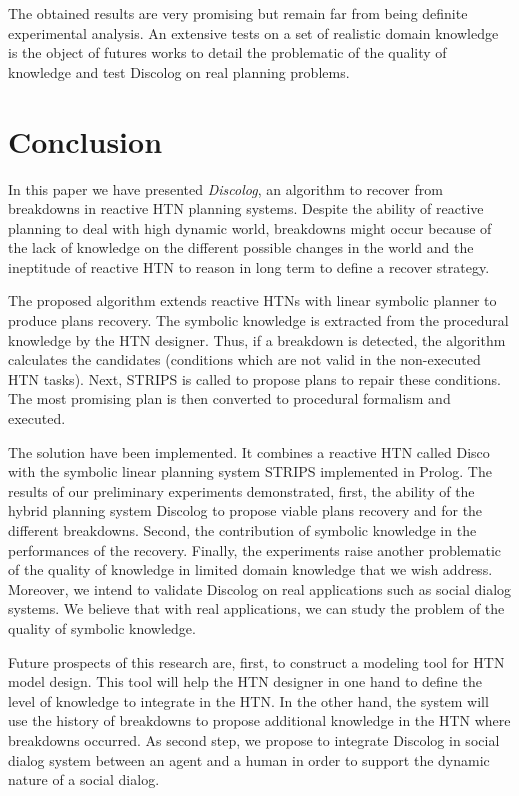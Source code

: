 \documentclass{llncs}
\begin{document}
			\par The obtained results are very promising but remain far from being definite experimental analysis. An extensive tests on a set of realistic domain knowledge is the object of futures works to detail the problematic of the quality of knowledge and test Discolog on real planning problems. 
			\section{Conclusion}
			\par In this paper we have presented \emph{Discolog}, an algorithm to recover from breakdowns in reactive HTN planning systems.  Despite the ability of reactive planning  to deal with high dynamic world,  breakdowns might occur because of the lack of knowledge on the different possible changes in the world and the ineptitude  of reactive HTN to reason in long term to define a recover strategy. 
			\par The proposed algorithm extends reactive HTNs with linear symbolic planner to produce plans recovery. The symbolic knowledge is extracted from the procedural knowledge by the HTN designer. Thus, if a breakdown is detected, the algorithm calculates the candidates (conditions which are not valid in the non-executed HTN tasks). Next,	STRIPS is called to propose plans to repair these conditions. The most promising plan is then converted to procedural formalism and executed. 
			\par The solution have been implemented. It combines a reactive HTN called Disco with the symbolic linear planning system STRIPS implemented in Prolog.  The results of our preliminary experiments  demonstrated, first, the ability of the hybrid planning system Discolog to propose viable plans recovery and for the different breakdowns. Second, the  contribution of symbolic knowledge in the performances of the recovery. Finally, the experiments raise another problematic of the quality of  knowledge in limited domain knowledge that we wish address. Moreover, we intend to validate Discolog on real  applications such as social dialog systems. We believe that with real applications, we can study the problem of the quality of symbolic knowledge.  
			\par Future prospects of this research are, first, to construct a modeling tool for HTN	model design. This tool will help the HTN designer in one hand to define the level of knowledge to integrate in the HTN. In the other hand, the system will use the history of breakdowns to propose additional knowledge in the HTN where breakdowns occurred. As second step, we propose to integrate Discolog in social dialog system between an agent and a human in order to support the dynamic nature of a social dialog.
		
			\label{Bibliography}
			
			
			
		
\end{document}
